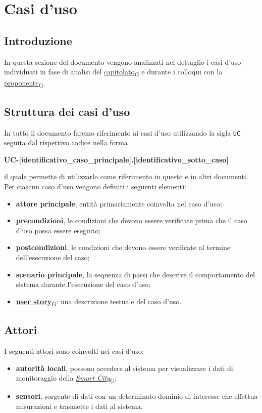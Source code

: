 \section{Casi d'uso}
\subsection{Introduzione}
In questa sezione del documento vengono analizzati nel dettaglio i casi d'uso individuati in fase di analisi del \href{https://7last.github.io/docs/rtb/documentazione-interna/glossario\#capitolato}{capitolato\textsubscript{G}} e durante i colloqui con la \href{https://7last.github.io/docs/rtb/documentazione-interna/glossario\#proponente}{proponente\textsubscript{G}}.

\subsection{Struttura dei casi d'uso}
In tutto il documento faremo riferimento ai casi d'uso utilizzando la sigla \texttt{UC} seguita dal rispettivo codice nella forma
\begin{center}
	\textbf{UC-[identificativo\_caso\_principale].[identificativo\_sotto\_caso]}
\end{center}
il quale permette di utilizzarlo come riferimento in questo e in altri documenti.\\
Per ciascun caso d'uso vengono definiti i seguenti elementi:
\begin{itemize}
	\item \textbf{attore principale}, entità primariamente coinvolta nel caso d'uso;
	\item \textbf{precondizioni}, le condizioni che devono essere verificate prima che il caso d'uso possa essere eseguito;
	\item \textbf{postcondizioni}, le condizioni che devono essere verificate al termine dell'esecuzione del caso;
	\item \textbf{scenario principale}, la sequenza di passi che descrive il comportamento del sistema durante l'esecuzione del caso d'uso;
	\item \href{https://7last.github.io/docs/rtb/documentazione-interna/glossario\#user-story}{\textbf{user story}\textsubscript{G}}: una descrizione testuale del caso d'uso.
\end{itemize}


\subsection{Attori}
I seguenti attori sono coinvolti nei casi d'uso:
\begin{itemize}
	\item \textbf{autorità locali}, possono accedere al sistema per visualizzare i dati di monitoraggio della \href{https://7last.github.io/docs/rtb/documentazione-interna/glossario\#smart-city}{\textit{Smart City}\textsubscript{G}};
	\item \textbf{sensori}, sorgente di dati con un determinato dominio di interesse che effettua misurazioni e trasmette i dati al sistema.
\end{itemize}

